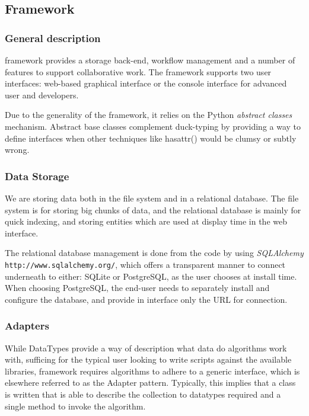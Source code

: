 	\subsection{\TVB Framework}

	\subsubsection{General description}

\TVB framework provides a storage back-end, workflow management and a number of features to
support collaborative work. The framework supports two user interfaces: web-based graphical interface or the
console interface for advanced user and developers.

Due to the generality of the framework, it relies on the Python \emph{abstract classes} mechanism.
Abstract base classes complement duck-typing by providing a way to define
interfaces when other techniques like hasattr() would be clumsy or subtly wrong.

\subsubsection{Data Storage}

We are storing data both in the file system and in a relational database.
The file system is for storing big chunks of data, and the relational database is mainly for quick indexing, 
and storing entities which are used at display time in the web interface.

The relational database management is done from the code by using \emph{SQLAlchemy} \texttt{http://www.sqlalchemy.org/}, 
which offers a transparent manner to connect underneath to either: SQLite or PostgreSQL, as the user chooses at install time.
When choosing PostgreSQL, the end-user needs to separately install and configure the database, and provide in \TVB
interface only the URL for connection.



\subsubsection{Adapters}

While DataTypes provide a way of description what data do algorithms work with, 
sufficing for the typical user looking to write scripts against the
available libraries, \TVB framework requires algorithms to adhere to 
a generic interface, which is elsewhere referred to as the Adapter pattern.
Typically, this implies that a class is written that is able to describe
the collection to datatypes required and a single method to invoke the
algorithm.

